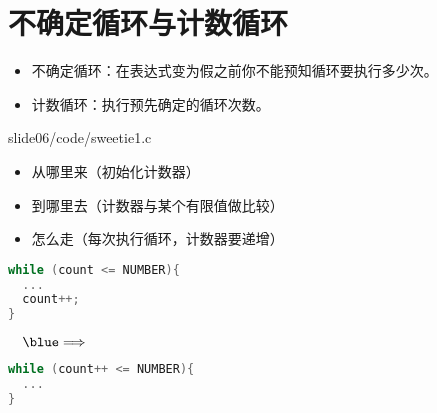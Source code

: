 \section{不确定循环与计数循环}
\begin{frame}[fragile]\ft{\secname}
\begin{itemize}
\item 不确定循环：在表达式变为假之前你不能预知循环要执行多少次。\\[0.1in]
\item 计数循环：执行预先确定的循环次数。
\end{itemize}
\end{frame}

\begin{frame}[fragile]\ft{\secname}

  
  {slide06/code/sweetie1.c}

\end{frame}

\begin{frame}[fragile]
\begin{itemize}
\item 从哪里来（初始化计数器）\\[0.1in]
\item 到哪里去（计数器与某个有限值做比较）\\[0.1in]
\item 怎么走（每次执行循环，计数器要递增）
\end{itemize}
\end{frame}

\begin{frame}[fragile]
\begin{minipage}{.6\textwidth}
\begin{lstlisting}[language=c,backgroundcolor=\color{red!10}]
while (count <= NUMBER){
  ...
  count++;
}
\end{lstlisting}
\end{minipage}
$~~~\blue\Longrightarrow~~~$
\begin{minipage}{.6\textwidth}
\begin{lstlisting}[language=c,backgroundcolor=\color{red!10}]
while (count++ <= NUMBER){
  ...
}
\end{lstlisting}
\end{minipage}
\end{frame}


